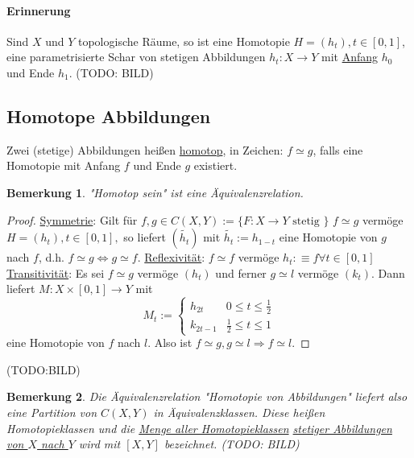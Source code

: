 \documentclass[a4paper,11pt,notitlepage]{report}
\newtheorem{definition}{Definition}[chapter]
\newtheorem{remark}{Bemerkung}[chapter]
\newenvironment{Kasten}[1]
{
\hspace{0.05\linewidth}
\begin{center}
\begin{minipage}{0.9\linewidth}
\setlength{\fboxsep}{18pt}
\definecolor{shadecolor}{gray}{0.9}
\definecolor{framecolor}{gray}{0}
\def\FrameCommand{\fcolorbox{framecolor}{shadecolor}}
\MakeFramed {\FrameRestore}
\subsection{#1}
\begin{itshape}
}
{
\end{itshape}
\endMakeFramed
\end{minipage}
\end{center}
\vspace{1em}
}
\begin{document}
\paragraph{Erinnerung}
Sind $X$ und $Y$ topologische Räume, so ist eine Homotopie $H = (h_t), t \in [0,1]$, eine parametrisierte Schar von stetigen Abbildungen $h_t \colon X \rightarrow Y$ mit \underline{Anfang} $h_0$ und Ende $h_1$. (TODO: BILD)

\begin{Kasten}{Homotope Abbildungen}
	Zwei (stetige) Abbildungen heißen \underline{homotop}, in Zeichen: $f \simeq g$, falls eine Homotopie mit Anfang $f$ und Ende $g$ existiert.
\end{Kasten}

\begin{remark}
"Homotop sein" ist eine Äquivalenzrelation.
\end{remark}

\begin{proof}
	\underline{Symmetrie}:
	Gilt für $f,g \in C(X,Y) := \{F \colon X \rightarrow Y \text{ stetig } \}$ $f \simeq g$ vermöge $H=(h_t), t \in [0,1],$ so liefert $(\tilde{h_t})$ mit $\tilde{h_t}:=h_{1-t}$ eine Homotopie von $g$ nach $f$, d.h. $f \simeq g \Leftrightarrow g \simeq f$.
	\newline
	\underline{Reflexivität}:
	$f \simeq f$ vermöge $h_t : \equiv f \forall t \in [0,1]$
	\newline
	\underline{Transitivität}:
	Es sei $f \simeq g$ vermöge $(h_t)$ und ferner $g \simeq l$ vermöge $(k_t)$.
	Dann liefert $M \colon X \times [0,1] \rightarrow Y$ mit
	$$M_t := \begin{cases} h_{2t} & 0 \leq t \leq \frac{1}{2} \\
	k_{2t-1} & \frac{1}{2} \leq t \leq 1
	\end{cases}$$
	eine Homotopie von $f$ nach $l$.
	\newline
	Also ist $f \simeq g, g \simeq l \Rightarrow f \simeq l$.
\end{proof}
(TODO:BILD)

\begin{remark}
Die Äquivalenzrelation "Homotopie von Abbildungen" liefert also eine Partition von $C(X,Y)$ in Äquivalenzklassen. Diese heißen Homotopieklassen und die \underline{Menge aller Homotopieklassen} \underline{stetiger Abbildungen} \underline{von $X$ nach $Y$} wird mit $[X,Y]$ bezeichnet.
(TODO: BILD)
\end{remark}
\end{document}
